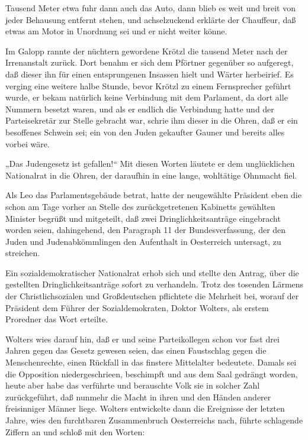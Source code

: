 Tausend Meter etwa fuhr dann auch das Auto, dann blieb es weit und
breit von jeder Behausung entfernt stehen, und achselzuckend
erklärte der Chauffeur, daß etwas am Motor in Unordnung sei und er
nicht weiter könne.

Im Galopp rannte der nüchtern gewordene Krötzl die tausend Meter
nach der Irrenanstalt zurück. Dort benahm  er sich
dem Pförtner gegenüber so aufgeregt, daß dieser ihn für einen
entsprungenen Insassen hielt und Wärter herbeirief. Es verging eine
weitere halbe Stunde, bevor Krötzl zu einem Fernsprecher geführt
wurde, er bekam natürlich keine Verbindung mit dem Parlament, da
dort alle Nummern besetzt waren, und als er endlich die Verbindung
hatte und der Parteisekretär zur Stelle gebracht war, schrie ihm
dieser in die Ohren, daß er ein besoffenes Schwein sei; ein von den
Juden gekaufter Gauner und bereits alles vorbei wäre.

„Das Judengesetz ist gefallen!“ Mit diesen Worten läutete er dem
unglücklichen Nationalrat in die Ohren, der daraufhin in eine
lange, wohltätige Ohnmacht fiel.

\tb{* * *}
Als Leo das Parlamentsgebäude betrat, hatte der neugewählte
Präsident eben die schon am Tage vorher an Stelle des
zurückgetretenen Kabinetts gewählten Minister begrüßt und
mitgeteilt, daß zwei Dringlichkeitsanträge eingebracht worden
seien, dahingehend, den Paragraph 11 der Bundesverfassung, der den
Juden und Judenabkömmlingen den Aufenthalt in Oesterreich
untersagt, zu streichen.

Ein sozialdemokratischer Nationalrat erhob sich und stellte den
Antrag, über die gestellten Dringlichkeitsanträge sofort zu
verhandeln. Trotz des tosenden Lärmens der Christlichsozialen und
Großdeutschen pflichtete die Mehrheit bei, worauf der Präsident dem
Führer der Sozialdemokraten, Doktor Wolters, als erstem Proredner
das Wort erteilte.

Wolters wies darauf hin, daß er und seine
Parteikollegen schon vor fast drei Jahren gegen das Gesetz gewesen
seien, das einen Faustschlag gegen die Menschenrechte, einen
Rückfall in das finstere Mittelalter bedeutete. Damals sei die
Opposition niedergeschrieen, beschimpft und aus dem Saal gedrängt
worden, heute aber habe das verführte und berauschte Volk sie in
solcher Zahl zurückgeführt, daß nunmehr die Macht in ihren und den
Händen anderer freisinniger Männer liege. Wolters entwickelte dann
die Ereignisse der letzten Jahre, wies den furchtbaren
Zusammenbruch Oesterreichs nach, führte schlagende Ziffern an und
schloß mit den Worten:

